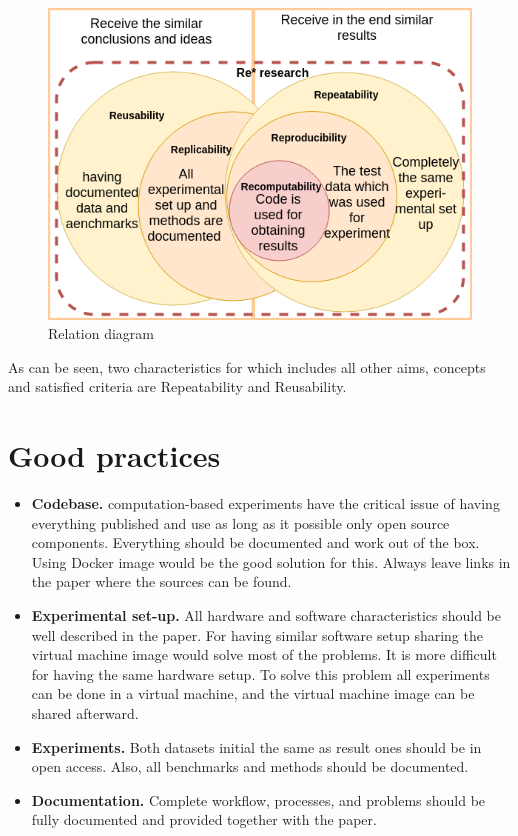 \begin{figure}[h!]
  \includegraphics[scale=0.7]{fig/relationdiagram.png}
  \caption{Relation diagram\cite{gith}}
  \label{fig:relationdiagram}
\end{figure}
As can be seen, two characteristics for which includes all other aims, concepts and satisfied criteria are Repeatability and Reusability.
\section{Good practices}
\begin{itemize}
    \item \textbf{Codebase.} computation-based experiments have the critical issue of having everything published and use as long as it possible only open source components. Everything should be documented and work out of the box. Using Docker image would be the good solution for this. Always leave links in the paper where the sources can be found.
    \item \textbf{Experimental set-up.} All hardware and software characteristics should be well described in the paper. For having similar software setup sharing the virtual machine image would solve most of the problems. It is more difficult for having the same hardware setup. To solve this problem all experiments can be done in a virtual machine, and the virtual machine image can be shared afterward. 
    \item \textbf{Experiments.}  Both datasets initial the same as result ones should be in open access. Also, all benchmarks and methods should be documented. 
    \item \textbf{Documentation.} Complete workflow, processes, and problems should be fully documented and provided together with the paper.
\end{itemize}
